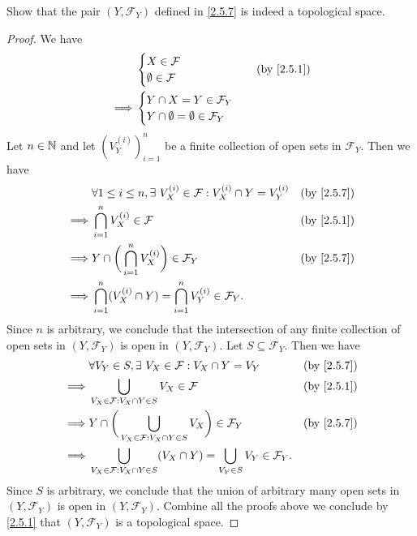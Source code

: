 \begin{ex}\label{ex:2.5.12}
  Show that the pair \((Y, \mathcal{F}_Y)\) defined in \cref{2.5.7} is indeed a topological space.
\end{ex}

\begin{proof}
  We have
  \begin{align*}
             & \begin{cases}
                 X \in \mathcal{F} \\
                 \emptyset \in \mathcal{F}
               \end{cases}                      & \text{(by \cref{2.5.1})} \\
    \implies & \begin{cases}
                 Y \cap X = Y \in \mathcal{F}_Y \\
                 Y \cap \emptyset = \emptyset \in \mathcal{F}_Y
               \end{cases}
  \end{align*}
  Let \(n \in \mathbb{N}\) and let \((V_Y^{(i)})_{i = 1}^n\) be a finite collection of open sets in \(\mathcal{F}_Y\).
  Then we have
  \begin{align*}
             & \forall 1 \leq i \leq n, \exists\ V_X^{(i)} \in \mathcal{F} : V_X^{(i)} \cap Y = V_Y^{(i)} & \text{(by \cref{2.5.7})} \\
    \implies & \bigcap_{i = 1}^n V_X^{(i)} \in \mathcal{F}                                                & \text{(by \cref{2.5.1})} \\
    \implies & Y \cap \bigg(\bigcap_{i = 1}^n V_X^{(i)}\bigg) \in \mathcal{F}_Y                           & \text{(by \cref{2.5.7})} \\
    \implies & \bigcap_{i = 1}^n (V_X^{(i)} \cap Y) = \bigcap_{i = 1}^n V_Y^{(i)} \in \mathcal{F}_Y.
  \end{align*}
  Since \(n\) is arbitrary, we conclude that the intersection of any finite collection of open sets in \((Y, \mathcal{F}_Y)\) is open in \((Y, \mathcal{F}_Y)\).
  Let \(S \subseteq \mathcal{F}_Y\).
  Then we have
  \begin{align*}
             & \forall V_Y \in S, \exists\ V_X \in \mathcal{F} : V_X \cap Y = V_Y                                         & \text{(by \cref{2.5.7})} \\
    \implies & \bigcup_{V_X \in \mathcal{F} : V_X \cap Y \in S} V_X \in \mathcal{F}                                       & \text{(by \cref{2.5.1})} \\
    \implies & Y \cap \bigg(\bigcup_{V_X \in \mathcal{F} : V_X \cap Y \in S} V_X\bigg) \in \mathcal{F}_Y                  & \text{(by \cref{2.5.7})} \\
    \implies & \bigcup_{V_X \in \mathcal{F} : V_X \cap Y \in S} (V_X \cap Y) = \bigcup_{V_Y \in S} V_Y \in \mathcal{F}_Y.
  \end{align*}
  Since \(S\) is arbitrary, we conclude that the union of arbitrary many open sets in \((Y, \mathcal{F}_Y)\) is open in \((Y, \mathcal{F}_Y)\).
  Combine all the proofs above we conclude by \cref{2.5.1} that \((Y, \mathcal{F}_Y)\) is a topological space.
\end{proof}

